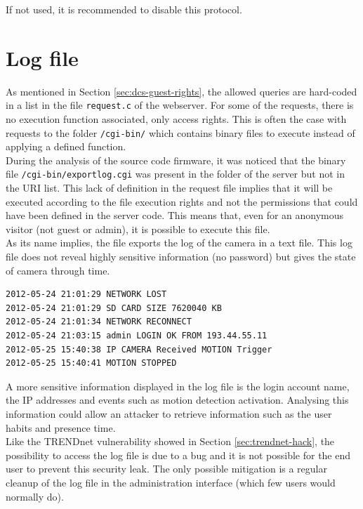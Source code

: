If not used, it is recommended to disable this protocol.

\section{Log file}
\label{sec:dcs-log}

As mentioned in Section \ref{sec:dcs-guest-rights}, the allowed queries are hard-coded in a list in the file \texttt{request.c} of the webserver.
For some of the requests, there is no execution function associated, only access rights.
This is often the case with requests to the folder \texttt{/cgi-bin/} which contains binary files to execute instead of applying a defined function.\\

During the analysis of the source code firmware, it was noticed that the binary file \texttt{/cgi-bin/exportlog.cgi} was present in the folder of the server but not in the URI list.
This lack of definition in the request file implies that it will be executed according to the file execution rights and not the permissions that could have been defined in the server code.
This means that, even for an anonymous visitor (not guest or admin), it is possible to execute this file.\\

As its name implies, the file exports the log of the camera in a text file.
This log file does not reveal highly sensitive information (no password) but gives the state of camera through time.

{\scriptsize
\begin{verbatim}
2012-05-24 21:01:29 NETWORK LOST
2012-05-24 21:01:29 SD CARD SIZE 7620040 KB
2012-05-24 21:01:34 NETWORK RECONNECT
2012-05-24 21:03:15 admin LOGIN OK FROM 193.44.55.11
2012-05-25 15:40:38 IP CAMERA Received MOTION Trigger
2012-05-25 15:40:41 MOTION STOPPED
\end{verbatim}
}

A more sensitive information displayed in the log file is the login account name, the IP addresses and events such as motion detection activation.
Analysing this information could allow an attacker to retrieve information such as the user habits and presence time.\\

Like the TRENDnet vulnerability showed in Section \ref{sec:trendnet-hack}, the possibility to access the log file is due to a bug and it is not possible for the end user to prevent this security leak.
The only possible mitigation is a regular cleanup of the log file in the administration interface (which few users would normally do).


